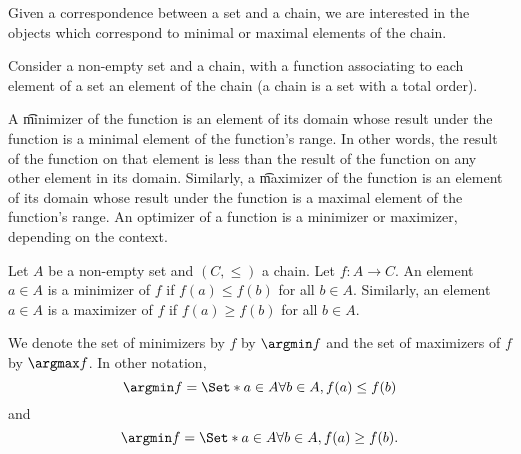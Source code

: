 

Given a correspondence between a set and a chain, we are interested in the objects which correspond to minimal or maximal elements of the chain.


Consider a non-empty set and a chain, with a function associating to each element of a set an element of the chain (a chain is a set with a total order).

A \t{minimizer} of the function is an element of its domain whose result under the function is a minimal element of the function's range.
In other words, the result of the function on that element is less than the result of the function on any other element in its domain.
Similarly, a \t{maximizer} of the function is an element of its domain whose result under the function is a maximal element of the function's range.
An optimizer of a function is a minimizer or maximizer, depending on the context.


Let $A$ be a non-empty set and $(C, \leq)$ a chain.
Let $f: A \to C$.
An element $a \in A$ is a minimizer of $f$ if $f(a) \leq f(b)$ for all $b \in A$.
Similarly, an element $a \in A$ is a maximizer of $f$ if $f(a) \geq f(b)$ for all $b \in A$.

We denote the set of minimizers by $f$ by $\argmin f$ and the set of maximizers of $f$ by $\argmax f$. In other notation,
$$
  \argmin f = \Set*{a \in A}{\forall b \in A, f(a) \leq f(b) }
$$
and
$$
  \argmin f = \Set*{a \in A}{\forall b \in A, f(a) \geq f(b) }.
$$
